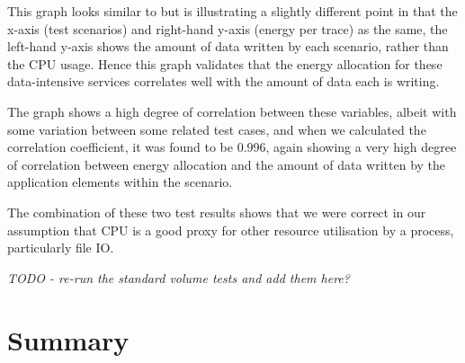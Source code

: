 This graph looks similar to  but is illustrating a slightly different point in that the x-axis (test scenarios) and right-hand y-axis (energy per trace) as the same, the left-hand y-axis shows the amount of data written by each scenario, rather than the CPU usage.  Hence this graph validates that the energy allocation for these data-intensive services correlates well with the amount of data each is writing.  

The graph shows a high degree of correlation between these variables, albeit with some variation between some related test cases, and when we calculated the correlation coefficient, it was found to be 0.996, again showing a very high degree of correlation between energy allocation and the amount of data written by the application elements within the scenario.

The combination of these two test results shows that we were correct in our assumption that CPU is a good proxy for other resource utilisation by a process, particularly file IO.

\textit{TODO - re-run the standard volume tests and add them here?}

\section{Summary}


